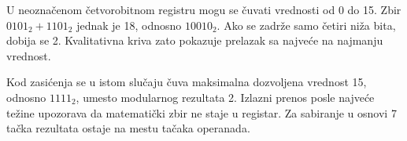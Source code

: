 U neoznačenom četvorobitnom registru mogu se čuvati vrednosti od 0 do 15. Zbir $0101_2+1101_2$ jednak je 18, odnosno $10010_2$. Ako se zadrže samo četiri niža bita, dobija se 2. Kvalitativna kriva zato pokazuje prelazak sa najveće na najmanju vrednost.

Kod zasićenja se u istom slučaju čuva maksimalna dozvoljena vrednost 15, odnosno $1111_2$, umesto modularnog rezultata 2. Izlazni prenos posle najveće težine upozorava da matematički zbir ne staje u registar. Za sabiranje u osnovi 7 tačka rezultata ostaje na mestu tačaka operanada.
